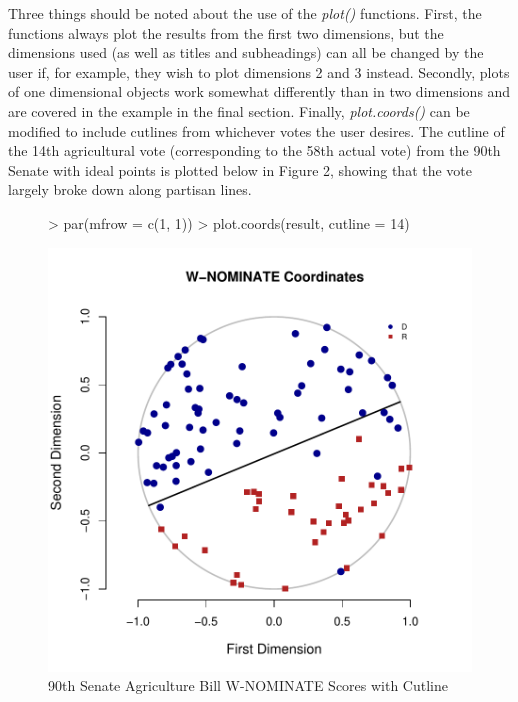 \documentclass[12pt]{article}
\begin{document}
Three things should be noted about the use of the \emph{plot()}
functions. First, the functions always plot the results from the
first two dimensions, but the dimensions used (as well as titles
and subheadings) can all be changed by the user if, for example,
they wish to plot dimensions 2 and 3 instead.  Secondly, plots of
one dimensional \verb@wnominate@ objects work somewhat differently
than in two dimensions
and are covered in the example in the final section.  Finally,
\emph{plot.coords()} can be modified to include cutlines from
whichever votes the user desires.  The cutline of the 14th 
agricultural vote (corresponding to the 58th actual vote)
from the 90th Senate with ideal points is plotted below in Figure
2, showing that the vote largely broke down along partisan
lines.

\begin{figure}
\begin{center}
\begin{Schunk}
\begin{Sinput}
> par(mfrow = c(1, 1))
> plot.coords(result, cutline = 14)
\end{Sinput}
\end{Schunk}
\includegraphics{wnominate-five}
\end{center}
\caption{90th Senate Agriculture Bill W-NOMINATE Scores with Cutline}
\label{fig:two}
\end{figure}
\end{document}
